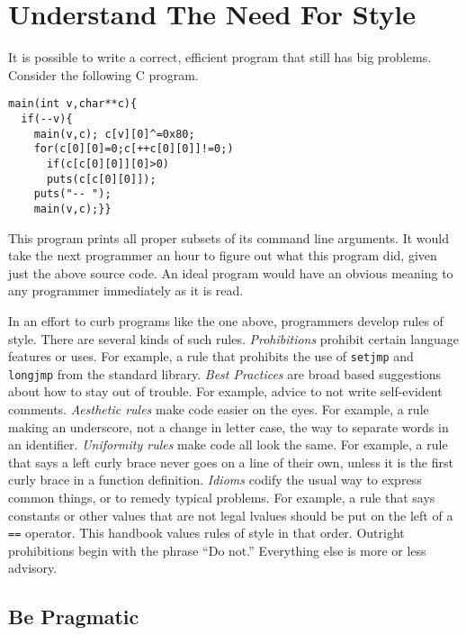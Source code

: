 \documentclass{lulu}
\newcommand{\code}[1]{\texttt{#1}\xspace}
\newcommand{\heading}[1]{\markboth{\textup{\thechapter\ -- #1}}{}}
\begin{document}
\chapter{Understand The Need For Style}
\heading{The Need For Style}

It is possible to write a correct, efficient program that still has
big problems.  Consider the following C program.

\begin{samepage}
\begin{verbatim}
main(int v,char**c){
  if(--v){
    main(v,c); c[v][0]^=0x80;
    for(c[0][0]=0;c[++c[0][0]]!=0;)
      if(c[c[0][0]][0]>0)
      puts(c[c[0][0]]);
    puts("-- ");
    main(v,c);}}
\end{verbatim}
\end{samepage}

This program prints all proper subsets of its command line arguments.
It would take the next programmer an hour to figure out what this
program did, given just the above source code.  An ideal program would
have an obvious meaning to any programmer immediately as it is read.

In an effort to curb programs like the one above, programmers develop
rules of style.  There are several kinds of such rules.
\textit{Prohibitions} prohibit certain language features or uses.  For
example, a rule that prohibits the use of \code{setjmp} and
\code{longjmp} from the standard library.  \textit{Best Practices} are
broad based suggestions about how to stay out of trouble.  For
example, advice to not write self-evident comments.  \textit{Aesthetic
  rules} make code easier on the eyes.  For example, a rule making an
underscore, not a change in letter case, the way to separate words in
an identifier.  \textit{Uniformity rules} make code all look the same.
For example, a rule that says a left curly brace never goes on a line
of their own, unless it is the first curly brace in a function
definition.  \textit{Idioms} codify the usual way to express common
things, or to remedy typical problems.  For example, a rule that says
constants or other values that are not legal lvalues should be put on
the left of a \code{==} operator.  This handbook values rules of style
in that order.  Outright prohibitions begin with the phrase ``Do
not.''  Everything else is more or less advisory.

\section{Be Pragmatic}
\end{document}
